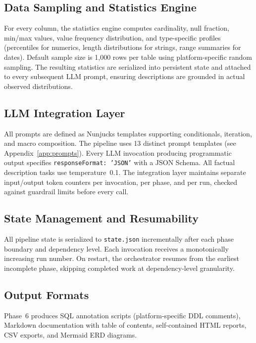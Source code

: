 \documentclass[twocolumn]{svjour3}
\begin{document}
\subsection{Data Sampling and Statistics Engine}

For every column, the statistics engine computes cardinality, null fraction, min/max values, value frequency distribution, and type-specific profiles (percentiles for numerics, length distributions for strings, range summaries for dates). Default sample size is 1,000 rows per table using platform-specific random sampling. The resulting statistics are serialized into persistent state and attached to every subsequent LLM prompt, ensuring descriptions are grounded in actual observed distributions.

\subsection{LLM Integration Layer}

All prompts are defined as Nunjucks templates supporting conditionals, iteration, and macro composition. The pipeline uses 13 distinct prompt templates (see Appendix~\ref{app:prompts}). Every LLM invocation producing programmatic output specifies \texttt{responseFormat:~'JSON'} with a JSON Schema. All factual description tasks use temperature~0.1. The integration layer maintains separate input/output token counters per invocation, per phase, and per run, checked against guardrail limits before every call.

\subsection{State Management and Resumability}

All pipeline state is serialized to \texttt{state.json} incrementally after each phase boundary and dependency level. Each invocation receives a monotonically increasing run number. On restart, the orchestrator resumes from the earliest incomplete phase, skipping completed work at dependency-level granularity.

\subsection{Output Formats}

Phase~6 produces SQL annotation scripts (platform-specific DDL comments), Markdown documentation with table of contents, self-contained HTML reports, CSV exports, and Mermaid ERD diagrams.
\end{document}
